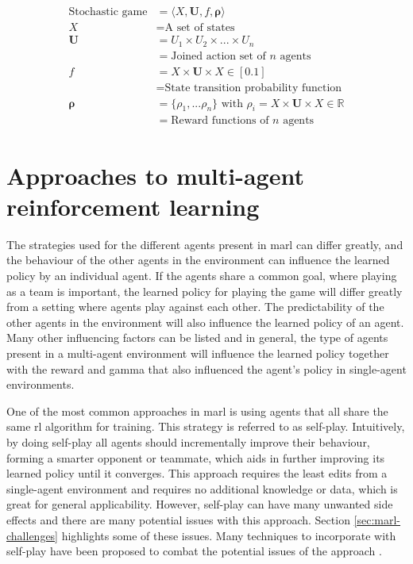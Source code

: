 \begin{equation}
\begin{aligned}
\text{Stochastic game} &= \langle X, \pmb{U}, f, \pmb{\rho} \rangle
\\
X &= \text{A set of states}
\\
\pmb{U} &= U_1 \times U_2 \times ... \times U_n \\
&= \text{Joined action set of $n$ agents}
\\
f &= X \times \pmb{U} \times X \in [0.1] \\
&= \text{State transition probability function}
\\
\pmb{\rho} &=  \{ \rho_1, ... \rho_n \} \text{ with } \rho_i = X \times \pmb{U} \times X \in \mathbb{R} \\
&= \text{Reward functions of $n$ agents}
\end{aligned}
\label{eq:marl_stoch-game}
\end{equation}



\section{Approaches to multi-agent reinforcement learning}
\label{sec:marl_opponents}

The strategies used for the different agents present in \gls{marl} can differ greatly, and the behaviour of the other agents in the environment can influence the learned policy by an individual agent.
If the agents share a common goal, where playing as a team is important, the learned policy for playing the game will differ greatly from a setting where agents play against each other.
The predictability of the other agents in the environment will also influence the learned policy of an agent.
Many other influencing factors can be listed and in general, the type of agents present in a multi-agent environment will influence the learned policy together with the reward and gamma that also influenced the agent's policy in single-agent environments.

One of the most common approaches in \gls{marl} is using agents that all share the same \gls{rl} algorithm for training.
This strategy is referred to as self-play.
Intuitively, by doing self-play all agents should incrementally improve their behaviour, forming a smarter opponent or teammate, which aids in further improving its learned policy until it converges. 
This approach requires the least edits from a single-agent environment and requires no additional knowledge or data, which is great for general applicability. 
However, self-play can have many unwanted side effects and there are many potential issues with this approach.
Section \ref{sec:marl-challenges} highlights some of these issues.
Many techniques to incorporate with self-play have been proposed to combat the potential issues of the approach \citep{selfplay, selfplay2, selfplay3}.

